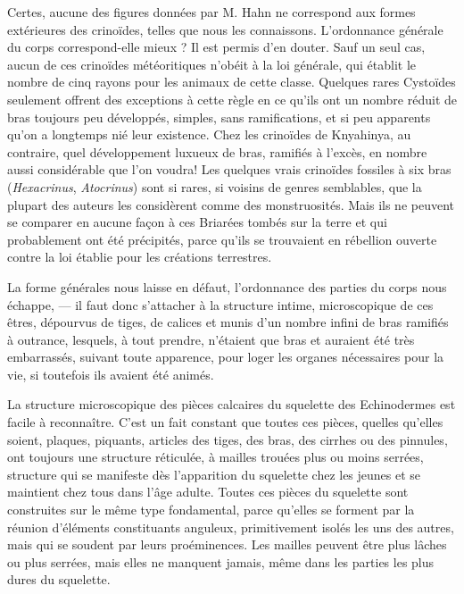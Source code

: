 \documentclass[a4paper, 12pt, oneside, french]{article}
\begin{document}
Certes, aucune des figures données par M. Hahn ne correspond aux formes extérieures des crinoïdes, telles que nous les connaissons. L'ordonnance générale du corps correspond-elle mieux ? Il est permis d'en douter. Sauf un seul cas, aucun de ces crinoïdes météoritiques n'obéit à la loi générale, qui établit le nombre de cinq rayons pour les animaux de cette classe. Quelques rares Cystoïdes seulement offrent des exceptions à cette règle en ce qu'ils ont un nombre réduit de bras toujours peu développés, simples, sans ramifications, et si peu apparents qu'on a longtemps nié leur existence. Chez les crinoïdes de Knyahinya, au contraire, quel développement luxueux de bras, ramifiés à l'excès, en nombre aussi considérable que l'on voudra! Les quelques vrais crinoïdes fossiles à six bras (\emph{Hexacrinus}, \emph{Atocrinus}) sont si rares, si voisins de genres semblables, que la plupart des auteurs les considèrent comme des monstruosités. Mais ils ne peuvent se comparer en aucune façon à ces Briarées tombés sur la terre et qui probablement ont été précipités, parce qu'ils se trouvaient en rébellion ouverte contre la loi établie pour les créations terrestres.

La forme générales nous laisse en défaut, l'ordonnance des parties du corps nous échappe, --- il faut donc s'attacher à la structure intime, microscopique de ces êtres, dépourvus de tiges, de calices et munis d'un nombre infini de bras ramifiés à outrance, lesquels, à tout prendre, n'étaient que bras et auraient été très embarrassés, suivant toute apparence, pour loger les organes nécessaires pour la vie, si toutefois ils avaient été animés.

La structure microscopique des pièces calcaires du squelette des Echinodermes est facile à reconnaître. C'est un fait constant que toutes ces pièces, quelles qu'elles soient, plaques, piquants, articles des tiges, des bras, des cirrhes ou des pinnules, ont toujours une structure réticulée, à mailles trouées plus ou moins serrées, structure qui se manifeste dès l'apparition du squelette chez les jeunes et se maintient chez tous dans l'âge adulte. Toutes ces pièces du squelette sont construites sur le même type fondamental, parce qu'elles se forment par la réunion d'éléments constituants anguleux, primitivement isolés les uns des autres, mais qui se soudent par leurs proéminences. Les mailles peuvent être plus lâches ou plus serrées, mais elles ne manquent jamais, même dans les parties les plus dures du squelette.
\end{document}
